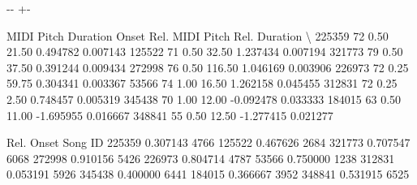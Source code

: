 \documentclass[letterpaper,10pt,english]{sphinxmanual}
\newlength\nbsphinxcodecellspacing
\begin{document}
{
\begin{sphinxVerbatim}[commandchars=\\\{\}]
\llap{\color{nbsphinxin}[255]:\,\hspace{\fboxrule}\hspace{\fboxsep}}
\end{sphinxVerbatim}
}

{

\kern-\sphinxverbatimsmallskipamount\kern-\baselineskip
\kern+\FrameHeightAdjust\kern-\fboxrule
\vspace{\nbsphinxcodecellspacing}

\begin{sphinxVerbatim}[commandchars=\\\{\}]
\llap{\color{nbsphinxout}[255]:\,\hspace{\fboxrule}\hspace{\fboxsep}}        MIDI Pitch  Duration   Onset  Rel. MIDI Pitch  Rel. Duration  \textbackslash{}
225359          72      0.50   21.50         0.494782       0.007143
125522          71      0.50   32.50         1.237434       0.007194
321773          79      0.50   37.50         0.391244       0.009434
272998          76      0.50  116.50         1.046169       0.003906
226973          72      0.25   59.75         0.304341       0.003367
53566           74      1.00   16.50         1.262158       0.045455
312831          72      0.25    2.50         0.748457       0.005319
345438          70      1.00   12.00        -0.092478       0.033333
184015          63      0.50   11.00        -1.695955       0.016667
348841          55      0.50   12.50        -1.277415       0.021277

        Rel. Onset  Song ID
225359    0.307143     4766
125522    0.467626     2684
321773    0.707547     6068
272998    0.910156     5426
226973    0.804714     4787
53566     0.750000     1238
312831    0.053191     5926
345438    0.400000     6441
184015    0.366667     3952
348841    0.531915     6525
\end{sphinxVerbatim}
}
\end{document}
